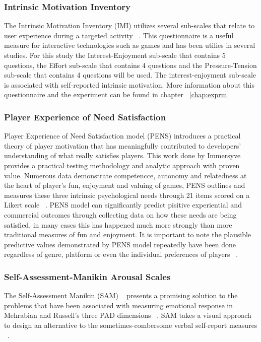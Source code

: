 \subsubsection{Intrinsic Motivation Inventory}
The Intrinsic Motivation Inventory (IMI) utilizes several sub-scales that relate to user experience during a targeted activity ~\cite{ryan1983relation}. This questionnaire is a useful measure for interactive technologies such as games and has been utilies in several studies. For this study the Interest-Enjoyment sub-scale that contains 5 questions, the Effort sub-scale that contains 4 questions and the Pressure-Tension sub-scale that contains 4 questions will be used. The interest-enjoyment sub-scale is associated with self-reported intrinsic motivation. More information about this questionnaire and the experiment can be found in chapter ~\ref{chap:exprm}

\subsubsection{Player Experience of Need Satisfaction}
Player Experience of Need Satisfaction model (PENS) introduces a practical theory of player motivation that has meaningfully contributed to developers' understanding of what really satisfies players. This work done by Immersyve ~\cite{rigby2007pens} provides a practical testing methodology and analytic approach with proven value. Numerous data demonstrate competencce, autonomy and relatedness at the heart of player's fun, enjoyment and valuing of games, PENS outlines and measures these three intrinsic psychological needs through 21 items scored on a Likert scale ~\cite{rigby2007pens}. PENS model can significantly predict pisitive experiential and commercial outcomes through collecting data on how these needs are being satisfied, in many cases this has happened much more strongly than more traditional measures of fun and enjoyment. It is important to note the plausible predictive values demonstrated by PENS model repeatedly have been done regardless of genre, platform or even the individual preferences of players ~\cite{rigby2007pens}.

\subsubsection{Self-Assessment-Manikin Arousal Scales}
The Self-Assessment Manikin (SAM) ~\cite{lang1985cognitive} presents a promising solution to the problems that have been associated with measuring emotional response in Mehrabian and Russell's three PAD dimensions ~\cite{russell1977evidence}. SAM takes a visual approach to design an alternative to the sometimes-combersome verbal self-report measures ~\cite{lang1985cognitive}.

